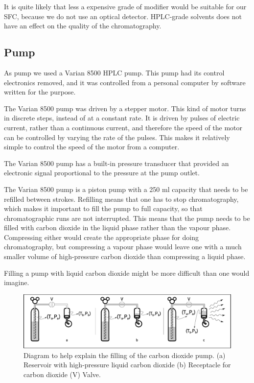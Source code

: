 It is quite likely that less a expensive grade of modifier would be suitable for
our SFC, because we do not use an optical detector. HPLC-grade solvents does not
have an effect on the quality of the chromatography.

\subsection{Pump}

As pump we used a Varian 8500 HPLC pump. This pump had its control electronics
removed, and it was controlled from a personal computer by software written for
the purpose.

The Varian 8500 pump was driven by a stepper motor. This kind of motor turns in
discrete steps, instead of at a constant rate. It is driven by pulses of
electric current, rather than a continuous current, and therefore the speed of
the motor can be controlled by varying the rate of the pulses. This makes it
relatively simple to control the speed of the motor from a computer.

The Varian 8500 pump has a built-in pressure transducer that provided an
electronic signal proportional to the pressure at the pump outlet.

The Varian 8500 pump is a piston pump with a 250 \si{\milli\litre} capacity that
needs to be refilled between strokes. Refilling means that one has to stop
chromatography, which makes it important to fill the pump to full capacity, so
that chromatographic runs are not interrupted. This means that the pump needs to
be filled with carbon dioxide in the liquid phase rather than the vapour phase.
Compressing either would create the appropriate phase for doing chromatography,
but compressing a vapour phase would leave one with a much smaller volume of
high-pressure carbon dioxide than compressing a liquid phase.

Filling a pump with liquid carbon dioxide might be more difficult than one would
imagine. 


\begin{figure}
\centering
\includegraphics[width=\textwidth]{Figures/CO2Filling.pdf}
\decoRule

\caption[Fillng a CO\textsubscript{2}]{Diagram to help explain the filling of
the carbon dioxide pump. (a) Reservoir with high-pressure liquid carbon dioxide
(b) Receptacle for carbon dioxide (V) Valve.}

\label{fig:co2fill}
\end{figure}

